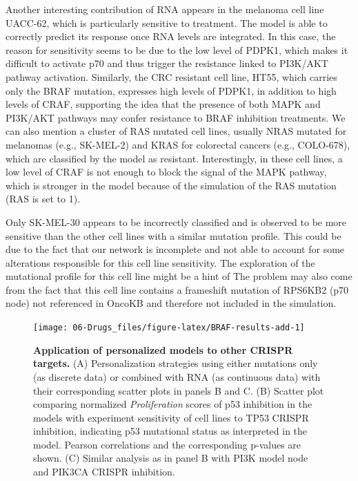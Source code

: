 \documentclass[a4paper,12pt,twoside,onecolumn,openright,final,oldfontcommands]{memoir}
\begin{document}
Another interesting contribution of RNA appears in the melanoma cell
line UACC-62, which is particularly sensitive to treatment. The model is
able to correctly predict its response once RNA levels are integrated.
In this case, the reason for sensitivity seems to be due to the low
level of PDPK1, which makes it difficult to activate p70 and thus
trigger the resistance linked to PI3K/AKT pathway activation. Similarly,
the CRC resistant cell line, HT55, which carries only the BRAF mutation,
expresses high levels of PDPK1, in addition to high levels of CRAF,
supporting the idea that the presence of both MAPK and PI3K/AKT pathways
may confer resistance to BRAF inhibition treatments. We can also mention
a cluster of RAS mutated cell lines, usually NRAS mutated for melanomas
(e.g., SK-MEL-2) and KRAS for colorectal cancers (e.g., COLO-678), which
are classified by the model as resistant. Interestingly, in these cell
lines, a low level of CRAF is not enough to block the signal of the MAPK
pathway, which is stronger in the model because of the simulation of the
RAS mutation (RAS is set to 1).

Only SK-MEL-30 appears to be incorrectly classified and is observed to
be more sensitive than the other cell lines with a similar mutation
profile. This could be due to the fact that our network is incomplete
and not able to account for some alterations responsible for this cell
line sensitivity. The exploration of the mutational profile for this
cell line might be a hint of The problem may also come from the fact
that this cell line contains a frameshift mutation of RPS6KB2 (p70 node)
not referenced in OncoKB and therefore not included in the simulation.

\begin{figure}

{\centering \texttt{[image: 06-Drugs\_files/figure-latex/BRAF-results-add-1]} 

}

\caption[Application of personalized models to other CRISPR targets]{\textbf{Application of personalized
models to other CRISPR targets.} (A) Personalization strategies using
either mutations only (as discrete data) or combined with RNA (as
continuous data) with their corresponding scatter plots in panels B and
C. (B) Scatter plot comparing normalized \emph{Proliferation} scores of
p53 inhibition in the models with experiment sensitivity of cell lines
to TP53 CRISPR inhibition, indicating p53 mutational status as
interpreted in the model. Pearson correlations and the corresponding
p-values are shown. (C) Similar analysis as in panel B with PI3K model
node and PIK3CA CRISPR inhibition.}\label{fig:BRAF-results-add}
\end{figure}
\end{document}
